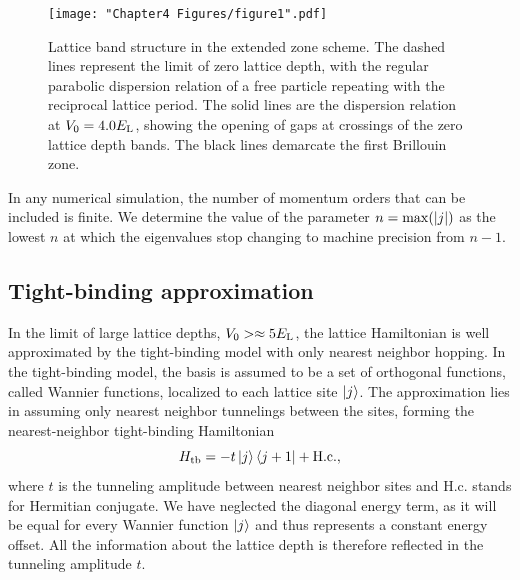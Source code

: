 \begin{figure}
	\texttt{[image: "Chapter4 Figures/figure1".pdf]}
\caption[Lattice band structure in the extended zone scheme]{Lattice band structure in the extended zone scheme. The dashed lines represent the limit of zero lattice depth, with the regular parabolic dispersion relation of a free particle repeating with the reciprocal lattice period. The solid lines are the dispersion relation at $V_0 = 4.0 E_{\rm L}$, showing the opening of gaps at crossings of the zero lattice depth bands. The black lines demarcate the first Brillouin zone. }
\label{fig:latticeBandStructure}
\end{figure}

In any numerical simulation, the number of momentum orders that can be included is finite. We determine the value of the parameter $n = {\rm max}(|j|)$ as the lowest $n$ at which the eigenvalues stop changing to machine precision from $n-1$.

\subsection{Tight-binding approximation}\label{sec:tightBinding}

In the limit of large lattice depths, $V_0 > \approx 5 E_{\rm L}$, the lattice Hamiltonian is well approximated by the tight-binding model with only nearest neighbor hopping. In the tight-binding model, the basis is assumed to be a set of orthogonal functions, called Wannier functions, localized to each lattice site $\mathinner{|{j}\rangle}$.  The approximation lies in assuming only nearest neighbor tunnelings between the sites, forming the nearest-neighbor tight-binding Hamiltonian
\begin{equation}
H_{\rm tb} = - t \mathinner{|{j}\rangle}\mathinner{\langle{j+1}|} + {\rm H.c.},
\end{equation}
where $t$ is the tunneling amplitude between nearest neighbor sites and H.c. stands for Hermitian conjugate. We have neglected the diagonal energy term, as it will be equal for every Wannier function $\mathinner{|{j}\rangle}$ and thus represents a constant energy offset. All the information about the lattice depth is therefore reflected in the tunneling amplitude $t$. 

